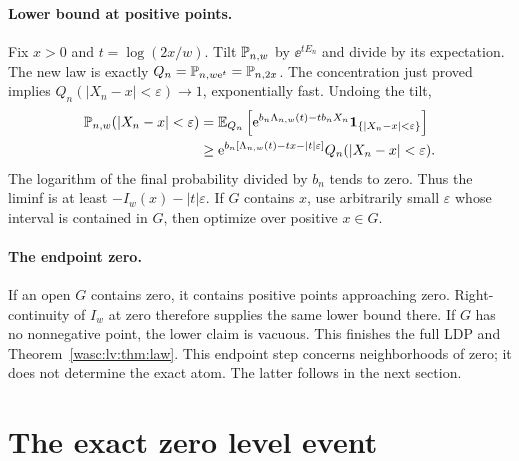 \documentclass[11pt,a4paper]{article}
\theoremstyle{remark}\newtheorem{remark}[theorem]{Remark}
\newcommand{\ind}{\mathbf 1}\newcommand{\wasc}{\operatorname{wasc}}\newcommand{\dasc}{\operatorname{dasc}}
\numberwithin{equation}{section}
\begin{document}
\paragraph{Lower bound at positive points.}
Fix $x>0$ and $t=\log(2x/w)$. Tilt $\mathbb P_{n,w}$ by $\ee^{tE_n}$ and divide by its expectation. The new law is exactly $Q_n=\mathbb P_{n,w\mathrm e^t}=\mathbb P_{n,2x}$.
The concentration just proved implies $Q_n(|X_n-x|<\varepsilon)\to1$, exponentially fast.
Undoing the tilt,
\begin{align*}
\Prob_{n,w}(|X_n-x|<\varepsilon)
&=\E_{Q_n}\left[\ee^{b_n\Lambda_{n,w}(t)-tb_nX_n}
\ind_{\{|X_n-x|<\varepsilon\}}\right]\\
&\ge\ee^{b_n[\Lambda_{n,w}(t)-tx-|t|\varepsilon]}
Q_n(|X_n-x|<\varepsilon).
\end{align*}
The logarithm of the final probability divided by $b_n$ tends to zero. Thus the liminf is at least $-I_w(x)-|t|\varepsilon$.
If $G$ contains $x$, use arbitrarily small $\varepsilon$ whose interval is contained in $G$, then optimize over positive $x\in G$.

\paragraph{The endpoint zero.}
If an open $G$ contains zero, it contains positive points approaching zero. Right-continuity of $I_w$ at zero therefore supplies the same lower bound there. If $G$ has no nonnegative point, the lower claim is vacuous. This finishes the full LDP and Theorem~\ref{wasc:lv:thm:law}.
This endpoint step concerns neighborhoods of zero; it does not determine the exact atom. The latter follows in the next section.

\section{The exact zero level event}\label{wasc:lv:sec:zero}
\end{document}
